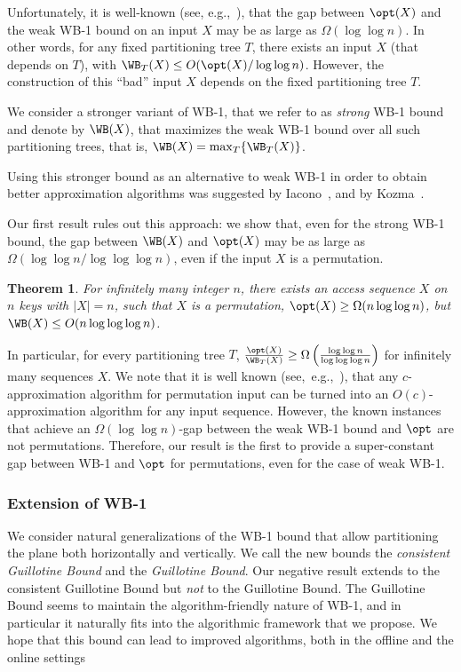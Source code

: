 \documentclass[11pt]{article}
\numberwithin{equation}{section}
\newtheorem{theorem}{Theorem}[section]
\theoremstyle{definition}
\theoremstyle{plain}
\begin{document}
Unfortunately, it is well-known (see, e.g.,~\cite{tango,multisplay,in_pursuit}), that the gap between $\opt(X)$
and the weak WB-1 bound on an input $X$ may be as large as  $\Omega(\log\log n)$. 
In other words, for any fixed partitioning tree $T$, there exists an input $X$ (that depends on $T$),  with $\WB_{T}(X)\leq O(\opt(X)/\log\log n)$.
However, the construction of this ``bad'' input $X$  depends on the fixed partitioning tree $T$. 


We consider a stronger variant of WB-1, that we refer to as \emph{strong} WB-1 bound and denote by $\WB(X)$, that maximizes the weak WB-1 bound over all such partitioning trees, that is, $\WB(X)=\max_{T}\{\WB_{T}(X)\}$. 


Using this stronger bound as an alternative to weak WB-1 in order to obtain better approximation algorithms was suggested by Iacono~\cite{in_pursuit}, and by Kozma~\cite{Kozma16_thesis}.



 
Our first result rules out this approach: we show that, even for the strong WB-1 bound, the gap between $\WB(X)$ and $\opt(X)$ may be as large as $\Omega(\log\log n/\log\log\log n)$, even if the input $X$ is a permutation. 


%
%
\begin{theorem}
	\label{thm:intro_WB}
	For infinitely many integer $n$, there exists
	an access sequence $X$ on $n$ keys with $|X|=n$, such that $X$ is a permutation, $\opt(X)\geq \Omega(n\log\log n)$, but $\WB(X)\leq O(n\log\log\log n)$.
\end{theorem}

In particular, for every partitioning tree $T$, $\frac{\opt(X)}{\WB_{T}(X)}\geq \Omega\left(\frac{\log\log n}{\log\log\log n}\right )$ for infinitely many sequences $X$.
We note that it is well known  (see,~e.g.,~\cite{FOCS15}), that any $c$-approximation algorithm for permutation input can be turned into an $O(c)$-approximation algorithm for any input sequence. However, the known instances that achieve an $\Omega(\log\log n)$-gap between the weak WB-1 bound and $\opt$ are not permutations. Therefore, our result is the first to provide a super-constant gap between WB-1 and $\opt$ for permutations, even for the case of weak WB-1.



\subsubsection{Extension of WB-1}
\label{sec:extension-intro} 
We consider natural generalizations of the WB-1 bound that allow partitioning the plane both horizontally and vertically. We call the new bounds the \emph{consistent Guillotine Bound} and the \emph{Guillotine Bound}. 
Our negative result extends to the consistent Guillotine Bound but \emph{not} to the Guillotine Bound. The Guillotine Bound seems to maintain the  algorithm-friendly nature of WB-1, and in particular it naturally fits into the algorithmic framework that we propose. We hope that this bound can lead to improved algorithms, both in the offline and the online settings
\end{document}
